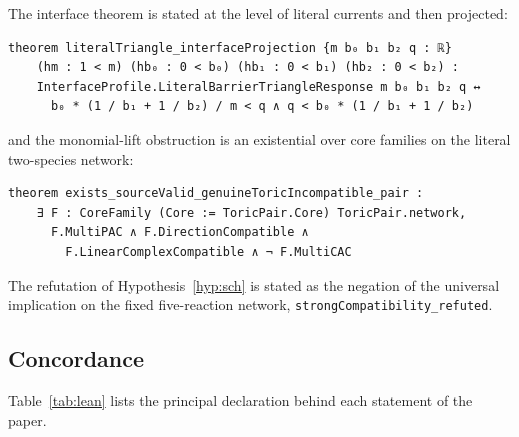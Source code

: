 \documentclass[11pt,a4paper]{article}
\theoremstyle{plain}
\theoremstyle{definition}
\theoremstyle{remark}
\newcommand{\lean}[1]{\texttt{#1}}
\begin{document}
The interface theorem is stated at the level of literal currents and then projected:
\begin{lstlisting}
theorem literalTriangle_interfaceProjection {m b₀ b₁ b₂ q : ℝ}
    (hm : 1 < m) (hb₀ : 0 < b₀) (hb₁ : 0 < b₁) (hb₂ : 0 < b₂) :
    InterfaceProfile.LiteralBarrierTriangleResponse m b₀ b₁ b₂ q ↔
      b₀ * (1 / b₁ + 1 / b₂) / m < q ∧ q < b₀ * (1 / b₁ + 1 / b₂)
\end{lstlisting}
and the monomial-lift obstruction is an existential over core families on the literal two-species network:
\begin{lstlisting}
theorem exists_sourceValid_genuineToricIncompatible_pair :
    ∃ F : CoreFamily (Core := ToricPair.Core) ToricPair.network,
      F.MultiPAC ∧ F.DirectionCompatible ∧
        F.LinearComplexCompatible ∧ ¬ F.MultiCAC
\end{lstlisting}
The refutation of Hypothesis~\ref{hyp:sch} is stated as the negation of the universal implication on the fixed five-reaction network, \lean{strongCompatibility\_refuted}.

\subsection{Concordance}

Table~\ref{tab:lean} lists the principal declaration behind each statement of the paper.
\end{document}
